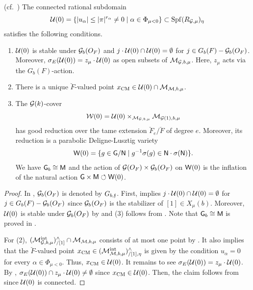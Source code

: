 \documentclass[12pt,reqno]{amsart}
\begin{document}
\begin{prop}\textup{(cf.\ \cite[Theorem 1]{Tak25z})} \label{prop:U(0)_previous_work}
    The connected rational subdomain
    \[
        {\mathcal{U}}(0) = \{ \lvert u_\alpha \rvert \leq \lvert \pi \rvert^{r_\alpha} \neq 0 \mid \alpha \in \Phi_{\mu < 0} \} \subset {\operatorname{Spf}}(R_{{\mathcal{G}}, \mu})_\eta
    \] 
    satisfies the following conditions. 
    \begin{enumerate}
        \item ${\mathcal{U}}(0)$ is stable under ${\mathcal{G}}_b(O_F)$ and $j \cdot {\mathcal{U}}(0) \cap {\mathcal{U}}(0) = \emptyset$ for $j \in G_b(F) - {\mathcal{G}}_b(O_F)$. Moreover, 
        $
            \sigma_E({\mathcal{U}}(0)) = z_\mu \cdot {\mathcal{U}}(0)
        $
        as open subsets of ${\mathcal{M}}_{{\mathcal{G}}, b, \mu}$. Here, $z_\mu$ acts via the $G_b(F)$-action. 
        \item There is a unique $\breve{F}$-valued point $x_{\operatorname{CM}} \in {\mathcal{U}}(0) \cap {\mathcal{M}}_{{\mathcal{M}}, b, \mu}$. 
        \item The ${\mathcal{G}}(k)$-cover 
        \[
            {\mathcal{W}}(0) = {\mathcal{U}}(0) \times_{{\mathcal{M}}_{{\mathcal{G}}, b, \mu}} {\mathcal{M}}_{{\mathcal{G}}(1), b, \mu}
        \]
        has good reduction over the tame extension $\breve{F}_e / \breve{F}$ of degree $e$. Moreover, its reduction is a parabolic Deligne-Lusztig variety 
        \[
            {\mathsf{W}}(0) =  \{g \in {\mathsf{G}}/{\mathsf{N}}\mid g^{-1} \sigma(g) \in {\mathsf{N}} \cdot \sigma({\mathsf{N}}) \}. 
        \]
        We have ${\mathsf{G}}_b \cong {\mathsf{M}}$ and the action of ${\mathcal{G}}(O_F) \times {\mathcal{G}}_b(O_F)$ on ${\mathsf{W}}(0)$ is the inflation of the natural action ${\mathsf{G}} \times {\mathsf{M}} \circlearrowleft {\mathsf{W}}(0)$. 
    \end{enumerate}
\end{prop}
\begin{proof}
    In \cite{Tak25z}, ${\mathcal{G}}_b(O_F)$ is denoted by $G_{b, {\mathfrak{f}}}$. First, \cite[Lemma 5.5]{Tak25z} implies $j \cdot {\mathcal{U}}(0) \cap {\mathcal{U}}(0) = \emptyset$ for $j \in G_b(F) - {\mathcal{G}}_b(O_F)$ since ${\mathcal{G}}_b(O_F)$ is the stabilizer of $[1] \in X_\mu(b)$. Moreover, ${\mathcal{U}}(0)$ is stable under ${\mathcal{G}}_b(O_F)$ by \cite[Proposition 5.7]{Tak25z} and (3) follows from \cite[Theorem 3.16, Proposition 5.7]{Tak25z}. Note that ${\mathsf{G}}_b \cong {\mathsf{M}}$ is proved in \cite[Lemma 5.6]{Tak25z}.
    
    For (2), $({\mathcal{M}}^{\operatorname{int}}_{{\mathcal{G}}, b, \mu})^\wedge_{/[1]} \cap {\mathcal{M}}_{{\mathcal{M}}, b, \mu}$ consists of at most one point by . It also implies that the $\breve{F}$-valued point $x_{\operatorname{CM}} \in ({\mathcal{M}}^{\operatorname{int}}_{{\mathcal{M}}, b, \mu})^\wedge_{/[1], \eta}$ is given by the condition $u_\alpha = 0$ for every $\alpha \in \Phi_{\mu < 0}$. Thus, $x_{\operatorname{CM}} \in {\mathcal{U}}(0)$. It remains to see $\sigma_E({\mathcal{U}}(0)) = z_\mu \cdot {\mathcal{U}}(0)$. By , $\sigma_E({\mathcal{U}}(0)) \cap z_\mu \cdot {\mathcal{U}}(0) \neq \emptyset$ since $x_{\operatorname{CM}} \in {\mathcal{U}}(0)$. Then, the claim follows from \cite[Proposition 5.14]{Tak25z} since ${\mathcal{U}}(0)$ is connected. 
\end{proof}
\end{document}
